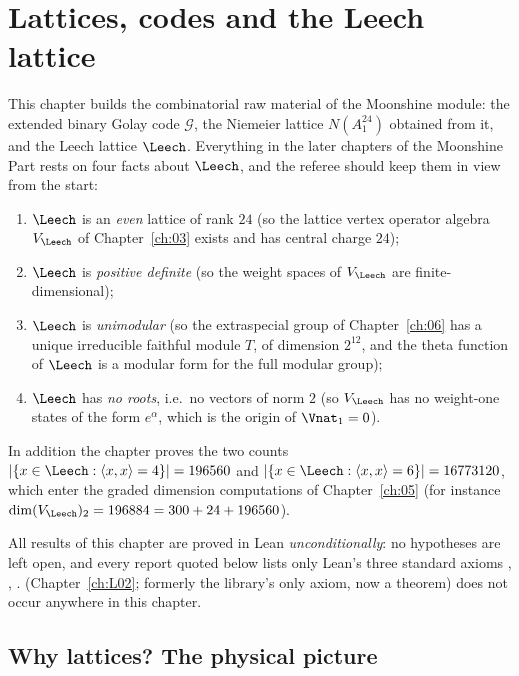 \chapter{Lattices, codes and the Leech lattice}\label{ch:02}

\providecommand{\chtwoG}{\mathcal{G}}
\providecommand{\chtwoF}{\mathbb{F}_2}
\providecommand{\chtwowt}{\operatorname{wt}}
\providecommand{\chtworank}{\operatorname{rank}}

This chapter builds the combinatorial raw material of the Moonshine module: the extended binary
Golay code $\chtwoG$, the Niemeier lattice $N(A_1^{24})$ obtained from it, and the Leech lattice
$\Leech$.  Everything in the later chapters of the Moonshine Part rests on four facts about
$\Leech$, and the referee should keep them in view from the start:
\begin{enumerate}[label=($\Lambda$\arabic*)]
  \item $\Leech$ is an \emph{even} lattice of rank $24$ (so the lattice vertex operator algebra
        $V_\Leech$ of Chapter~\ref{ch:03} exists and has central charge $24$);
  \item $\Leech$ is \emph{positive definite} (so the weight spaces of $V_\Leech$ are
        finite-dimensional);
  \item $\Leech$ is \emph{unimodular} (so the extraspecial group of Chapter~\ref{ch:06} has a
        unique irreducible faithful module $T$, of dimension $2^{12}$, and the theta function of
        $\Leech$ is a modular form for the full modular group);
  \item $\Leech$ has \emph{no roots}, i.e.\ no vectors of norm $2$ (so $V_\Leech$ has no
        weight-one states of the form $e^\alpha$, which is the origin of $\Vnat_1=0$).
\end{enumerate}
In addition the chapter proves the two counts $|\{x\in\Leech:\langle x,x\rangle=4\}|=196560$ and
$|\{x\in\Leech:\langle x,x\rangle=6\}|=16773120$, which enter the graded dimension computations
of Chapter~\ref{ch:05} (for instance $\dim (V_\Leech)_2 = 196884 = 300+24+196560$).

All results of this chapter are proved in Lean \emph{unconditionally}: no hypotheses are left
open, and every  report quoted below lists only Lean's three standard axioms
, , .  
(Chapter~\ref{ch:L02}; formerly the library's only axiom, now a theorem) does not occur anywhere
in this chapter.

\section{Why lattices? The physical picture}\label{ch02:sec:physics}

